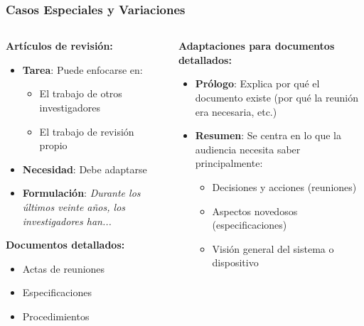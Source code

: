 \documentclass{beamer}
\begin{document}
\begin{frame}
\frametitle{Casos Especiales y Variaciones}

\begin{columns}[T]
\begin{column}{0.48\textwidth}
\textbf{Artículos de revisión:}
\begin{itemize}
    \item \textbf{Tarea}: Puede enfocarse en:
    \begin{itemize}
        \item El trabajo de otros investigadores
        \item El trabajo de revisión propio
    \end{itemize}
    \item \textbf{Necesidad}: Debe adaptarse 
    \item \textbf{Formulación}: \textit{Durante los últimos veinte años, los investigadores han...}
\end{itemize}

\vspace{0.2cm}
\textbf{Documentos detallados:}
\begin{itemize}
    \item Actas de reuniones
    \item Especificaciones
    \item Procedimientos
\end{itemize}
\end{column}

\begin{column}{0.48\textwidth}
\textbf{Adaptaciones para documentos detallados:}
\begin{itemize}
    \item \textbf{Prólogo}: Explica por qué el documento existe (por qué la reunión era necesaria, etc.)
    \item \textbf{Resumen}: Se centra en lo que la audiencia necesita saber principalmente:
    \begin{itemize}
        \item Decisiones y acciones (reuniones)
        \item Aspectos novedosos (especificaciones)
        \item Visión general del sistema o dispositivo
    \end{itemize}
\end{itemize}

\end{column}
\end{columns}
\end{frame}
\end{document}
